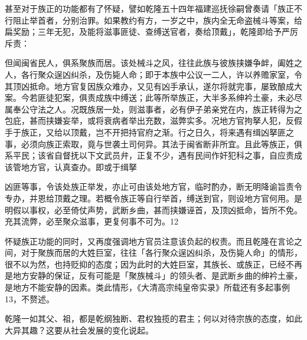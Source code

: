 甚至对于族正的功能都有了怀疑，譬如乾隆五十四年福建巡抚徐嗣曾奏请「族正不行阻止举首者，分别治罪。如果教约有方，一岁之中，族内全无命盗械斗等案，给扁奖励；三年无犯，及能将滋事匪徒、查缚送官者，奏给顶戴」，乾隆即给予严厉斥责：

\begin{BookQuote}
但闻闽省民人，俱系聚族而居。该处械斗之风，往往此族与彼族挟嫌争衅，阖姓之人，各行聚众逞凶纠杀，及伤毙人命；即于本族中公议一二人，许以养赡家室，令其顶凶抵命。地方官复因族众难办，又见有凶手承认，遂尔将就完事，屡致酿成大案。今若匪徒犯案，俱责成族中缚送；此等所举族正，大半多系绅衿土豪，未必尽属奉公守法之人。况既族居一处，则滋事者，必有伊子弟亲党在内，族正转得为之包庇，甚而挟嫌妄举，或将衰病者举出充数，滋弊实多。况地方官拘拏人犯，反假手于族正，又给以顶戴，岂不开把持官府之渐。行之日久，将来遇有缉凶拏匪之事，必须向族正索取，竟与世袭土司何异。其法于闽省断非所宜。且此等族正，俱系平民；该省自督抚以下文武员弁，正复不少，遇有民间作奸犯科之事，自应责成该管地方官，认真查办。即或于缉拏
\end{BookQuote}

\vfill
\begin{BookNotes}
\end{BookNotes}

\begin{BookQuote}
凶匪等事，令该处族正举发，亦止可由该处地方官，临时酌办，断无明降谕旨责令专办，并恩给顶戴之理。若概令族正等自行举首，缚送到官，则设地方官何用。是明假以事权，必至倚仗声势，武断乡曲，甚而挟嫌诬首，及顶凶抵命，皆所不免。充其流弊，必至聚众滋事，更复何事不可为。12
\end{BookQuote}

怀疑族正功能的同时，又再度强调地方官员注意该负起的权责。而且乾隆在言论之间，对于聚族而居的大姓巨室，往往「各行聚众逞凶纠杀，及伤毙人命」的情形，很不以为然，也持贬抑的态度；因为此时的大姓巨室，其族长、或族正，已经不再是地方安静的保证，反有可能是「聚族械斗」的领头者、是武断乡曲的绅衿土豪，是地方不能安静的因素。类此情形，《大清高宗纯皇帝实录》所载还有多起事例13，不赘述。


乾隆一如其父、祖，都是乾纲独断、君权独揽的君主；何以对待宗族的态度，如此大异其趣？这要从社会发展的变化说起。

